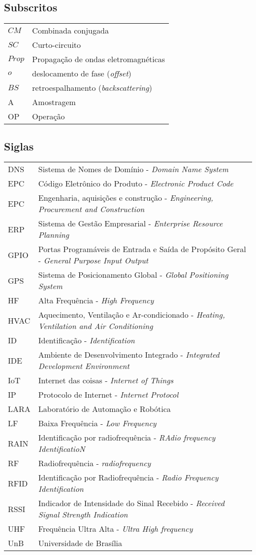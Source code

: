 \subsection*{Subscritos}

\begin{tabular}{p{}p{}}
$CM$  & Combinada conjugada \tabularnewline
$SC$  & Curto-circuito \tabularnewline
$Prop$  & Propagação de ondas eletromagnéticas \tabularnewline
$o$  & deslocamento de fase (\textit{offset})\tabularnewline
$BS$ & retroespalhamento (\textit{backscattering}) \tabularnewline
A & Amostragem \tabularnewline
OP & Operação
\end{tabular}





\subsection*{Siglas}

\begin{tabular}{p{}p{}}
DNS & Sistema de Nomes de Domínio -  \textit{Domain Name System} \tabularnewline
EPC  & Código Eletrônico do Produto - \textit{Electronic Product Code}\tabularnewline
EPC & Engenharia, aquisições e construção - \textit{Engineering, Procurement and Construction} \tabularnewline
ERP & Sistema de Gestão Empresarial - \textit{Enterprise Resource Planning} \tabularnewline
GPIO & Portas Programáveis de Entrada e Saída de Propósito Geral - \textit{General Purpose Input Output} \tabularnewline
GPS & Sistema de Posicionamento Global - \textit{Global Positioning System} \tabularnewline
HF & Alta Frequência - \textit{High Frequency} \tabularnewline
HVAC & Aquecimento, Ventilação e Ar-condicionado - \textit{Heating, Ventilation and Air Conditioning}\tabularnewline
ID & Identificação - \textit{Identification} \tabularnewline
IDE & Ambiente de Desenvolvimento Integrado - \textit{Integrated Development Environment} \tabularnewline
IoT & Internet das coisas - \textit{Internet of Things} \tabularnewline
IP & Protocolo de Internet - \textit{Internet Protocol} \tabularnewline
LARA & Laboratório de Automação e Robótica \tabularnewline
LF & Baixa Frequência - \textit{Low Frequency} \tabularnewline
RAIN & Identificação por radiofrequência - \textit{RAdio frequency IdentificatioN} \tabularnewline
RF & Radiofrequência - \textit{radiofrequency} \tabularnewline
RFID & Identificação por Radiofrequência - \textit{Radio Frequency Identification}\tabularnewline
RSSI &  Indicador de Intensidade do Sinal Recebido - \textit{Received Signal Strength Indication} \tabularnewline
UHF & Frequência Ultra Alta - \textit{Ultra High frequency} \tabularnewline
UnB & Universidade de Brasília \tabularnewline
\end{tabular}
